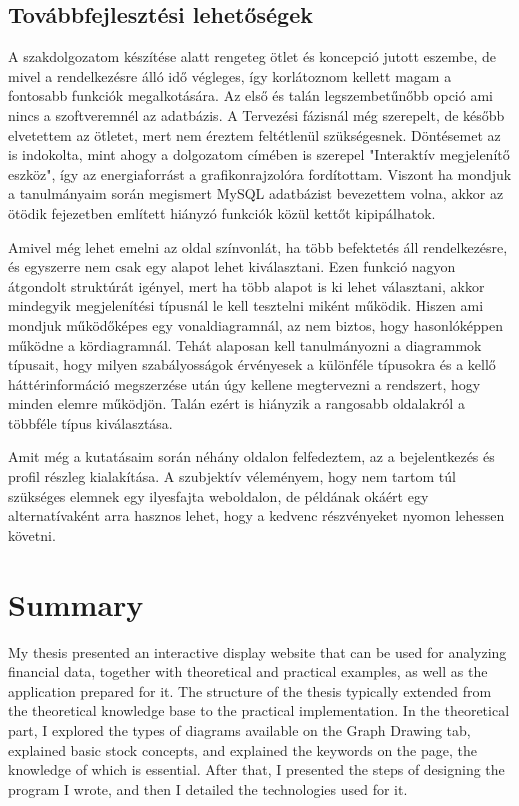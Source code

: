 \subsection{Továbbfejlesztési lehetőségek}

A szakdolgozatom készítése alatt rengeteg ötlet és koncepció jutott eszembe, de mivel a rendelkezésre álló idő végleges, így korlátoznom kellett magam a fontosabb funkciók megalkotására. Az első és talán legszembetűnőbb opció ami nincs a szoftveremnél az adatbázis. A Tervezési fázisnál még szerepelt, de később elvetettem az ötletet, mert nem éreztem feltétlenül szükségesnek. Döntésemet az is indokolta, mint ahogy a dolgozatom címében is szerepel "Interaktív megjelenítő eszköz", így az energiaforrást a grafikonrajzolóra fordítottam. Viszont ha mondjuk a tanulmányaim során megismert MySQL adatbázist bevezettem volna, akkor az ötödik fejezetben említett hiányzó funkciók közül kettőt kipipálhatok.

	Amivel még lehet emelni az oldal színvonlát, ha több befektetés áll rendelkezésre, és egyszerre nem csak egy alapot lehet kiválasztani. Ezen funkció nagyon átgondolt struktúrát igényel, mert ha több alapot is ki lehet választani, akkor mindegyik megjelenítési típusnál le kell tesztelni miként működik. Hiszen ami mondjuk működőképes egy vonaldiagramnál, az nem biztos, hogy hasonlóképpen működne a kördiagramnál. Tehát alaposan kell tanulmányozni a diagrammok típusait, hogy milyen szabályosságok érvényesek a különféle típusokra és a kellő háttérinformáció megszerzése után úgy kellene megtervezni a rendszert, hogy minden elemre működjön. Talán ezért is hiányzik a rangosabb oldalakról a többféle típus kiválasztása.

	Amit még a kutatásaim során néhány oldalon felfedeztem, az a bejelentkezés és profil részleg kialakítása. A szubjektív véleményem, hogy nem tartom túl szükséges elemnek egy ilyesfajta weboldalon, de példának okáért egy alternatívaként arra hasznos lehet, hogy a kedvenc részvényeket nyomon lehessen követni.

\section{Summary}

My thesis presented an interactive display website that can be used for analyzing financial data, together with theoretical and practical examples, as well as the application prepared for it. The structure of the thesis typically extended from the theoretical knowledge base to the practical implementation. In the theoretical part, I explored the types of diagrams available on the Graph Drawing tab, explained basic stock concepts, and explained the keywords on the page, the knowledge of which is essential. After that, I presented the steps of designing the program I wrote, and then I detailed the technologies used for it.


